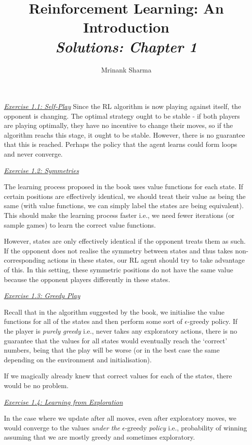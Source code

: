 \documentclass{article}
\title{\textbf{Reinforcement Learning: An Introduction}\\
\textit{Solutions: Chapter 1}
}
\author{Mrinank Sharma}
\newcommand{\myq}[1]{%
	\vspace{1em}
	\noindent\underline{\emph{Exercise #1}}\vspace{0.25em}\linebreak
}
\begin{document}
\maketitle
\noindent\underline{\emph{Exercise 1.1: Self-Play}}\vspace{0.25em}\linebreak
Since the RL algorithm is now playing against itself, the opponent is changing. The optimal strategy ought to be stable - if both players are playing optimally, they have no incentive to change their moves, so if the algorithm reachs this stage, it ought to be stable. However, there is no guarantee that this is reached. Perhaps the policy that the agent learns could form loops and never converge. 

\myq{1.2: Symmetries}
The learning process proposed in the book uses value functions for each state. If certain positions are effectively identical, we should treat their value as being the same (with value functions, we can simply label the states are being equivalent). This should make the learning process faster i.e., we need fewer iterations (or sample games) to learn the correct value functions. 

However, states are only effectively identical if the opponent treats them as such. If the opponent does not realise the symmetry between states and thus takes non-corresponding actions in these states, our RL agent should try to take advantage of this. In this setting, these symmetric positions do not have the same value because the opponent players differently in these states. 

\myq{1.3: Greedy Play}
Recall that in the algorithm suggested by the book, we initialise the value functions for all of the states and then perform some sort of $\epsilon$-greedy policy. If the player is \emph{purely greedy} i.e., never takes any exploratory actions, there is no guarantee that the values for all states would eventually reach the `correct' numbers, being that the play will be worse (or in the best case the same depending on the environment and initialisation). 

If we magically already knew that correct values for each of the states, there would be no problem. 

\myq{1.4: Learning from Exploration}
In the case where we update after all moves, even after exploratory moves, we would converge to the values \emph{under the} $\epsilon$-greedy \emph{policy} i.e., probability of winning assuming that we are mostly greedy and sometimes exploratory. 
\end{document}
